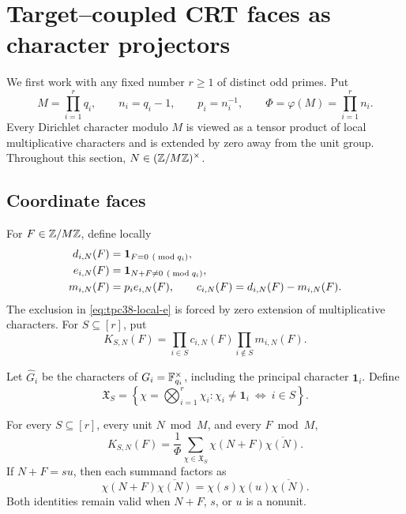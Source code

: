 \section{Target--coupled CRT faces as character projectors}
\label{sec:tpc38-character-projectors}

We first work with any fixed number \(r\ge1\) of distinct odd primes.
Put
\begin{equation}
 M=\prod_{i=1}^rq_i,\qquad
 n_i=q_i-1,\qquad p_i=n_i^{-1},\qquad
 \Phi=\varphi(M)=\prod_{i=1}^rn_i.
 \label{eq:tpc38-general-M}
\end{equation}
Every Dirichlet character modulo \(M\) is viewed as a tensor product of
local multiplicative characters and is extended by zero away from the
unit group.  Throughout this section, \(N\in(\mathbb Z/M\mathbb Z)^\times\).

\subsection{Coordinate faces}

For \(F\in\mathbb Z/M\mathbb Z\), define locally
\begin{align}
 d_{i,N}(F)&=\mathbf 1_{F=0\ (\bmod q_i)},
 \label{eq:tpc38-local-d}\\
 e_{i,N}(F)&=\mathbf 1_{N+F\ne0\ (\bmod q_i)},
 \label{eq:tpc38-local-e}\\
 m_{i,N}(F)&=p_i e_{i,N}(F),
 \qquad
 c_{i,N}(F)=d_{i,N}(F)-m_{i,N}(F).
 \label{eq:tpc38-local-m-c}
\end{align}
The exclusion in \eqref{eq:tpc38-local-e} is forced by zero extension of
multiplicative characters.  For \(S\subseteq[r]\), put
\begin{equation}
 K_{S,N}(F)
 =\prod_{i\in S}c_{i,N}(F)
  \prod_{i\notin S}m_{i,N}(F).
 \label{eq:tpc38-coordinate-face}
\end{equation}

Let \(\widehat G_i\) be the characters of
\(G_i=\mathbb F_{q_i}^\times\), including the principal character
\(\mathbf1_i\).  Define
\begin{equation}
 \mathfrak X_S
 =\left\{\chi=\bigotimes_{i=1}^r\chi_i:
 \chi_i\ne\mathbf1_i\ \Longleftrightarrow\ i\in S\right\}.
 \label{eq:tpc38-character-family-S}
\end{equation}

\begin{theorem}
\label{thm:tpc38-character-projector}
For every \(S\subseteq[r]\), every unit \(N\bmod M\), and every
\(F\bmod M\),
\begin{equation}
 \boxed{
 K_{S,N}(F)
 =\frac1\Phi\sum_{\chi\in\mathfrak X_S}
 \chi(N+F)\overline{\chi(N)}.}
 \label{eq:tpc38-character-projector}
\end{equation}
If \(N+F=su\), then each summand factors as
\begin{equation}
 \chi(N+F)\overline{\chi(N)}
 =\chi(s)\chi(u)\overline{\chi(N)}.
 \label{eq:tpc38-character-product-factor}
\end{equation}
Both identities remain valid when \(N+F\), \(s\), or \(u\) is a nonunit.
\end{theorem}

